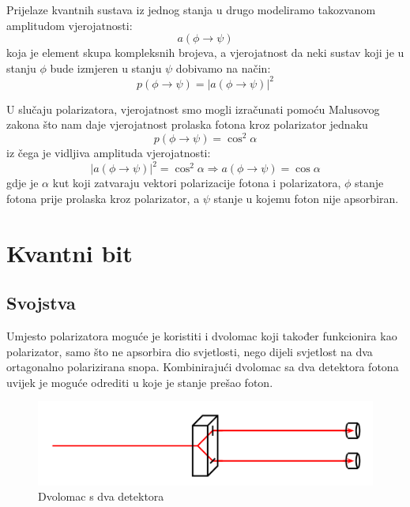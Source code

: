 Prijelaze kvantnih sustava iz jednog stanja u drugo modeliramo takozvanom amplitudom vjerojatnosti:
\begin{equation}
a(\phi \rightarrow \psi)
\end{equation}
koja je element skupa kompleksnih brojeva, a vjerojatnost da neki sustav koji je u stanju $\phi$ bude izmjeren u stanju $\psi$ dobivamo na način:
\begin{equation}
p(\phi \rightarrow \psi) = |a(\phi \rightarrow \psi)|^2
\end{equation}

U slučaju polarizatora, vjerojatnost smo mogli izračunati pomoću Malusovog zakona što nam daje vjerojatnost prolaska fotona kroz polarizator jednaku
\begin{equation}
p(\phi \rightarrow \psi) = \cos^2 \alpha
\end{equation}
iz čega je vidljiva amplituda vjerojatnosti:
\begin{equation}
|a(\phi \rightarrow \psi)|^2 = \cos^2 \alpha \Rightarrow a(\phi \rightarrow \psi) = \cos \alpha
\end{equation}
gdje je $\alpha$ kut koji zatvaraju vektori polarizacije fotona i polarizatora, $\phi$ stanje fotona prije prolaska kroz polarizator, a $\psi$ stanje u kojemu foton nije apsorbiran.



\section{Kvantni bit}

\subsection{Svojstva}
Umjesto polarizatora moguće je koristiti i dvolomac koji također funkcionira kao polarizator, samo što ne apsorbira dio svjetlosti, nego dijeli svjetlost na dva ortagonalno polarizirana snopa. Kombinirajući dvolomac sa dva detektora fotona uvijek je moguće odrediti u koje je stanje prešao foton.
\begin{figure}[h!]
\centering
\includegraphics[scale=0.5]{img/dvolomac_detektor.png}
\caption{Dvolomac s dva detektora} 
\end{figure}

